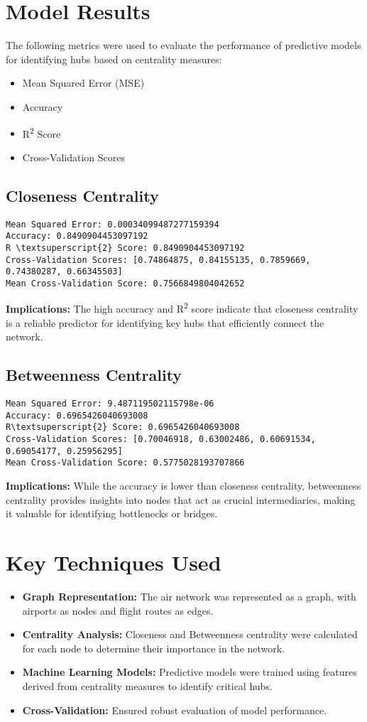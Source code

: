 \documentclass[12pt]{article}
\begin{document}
\section*{Model Results}
The following metrics were used to evaluate the performance of predictive models for identifying hubs based on centrality measures:
\begin{itemize}
	\item Mean Squared Error (MSE)
	\item Accuracy
	\item R\textsuperscript{2} Score
	\item Cross-Validation Scores
\end{itemize}

\subsection*{Closeness Centrality}
\begin{verbatim}
Mean Squared Error: 0.00034099487277159394
Accuracy: 0.8490904453097192
R \textsuperscript{2} Score: 0.8490904453097192
Cross-Validation Scores: [0.74864875, 0.84155135, 0.7859669, 0.74380287, 0.66345503]
Mean Cross-Validation Score: 0.7566849804042652
\end{verbatim}
\textbf{Implications:} The high accuracy and R\textsuperscript{2} score indicate that closeness centrality is a reliable predictor for identifying key hubs that efficiently connect the network.

\subsection*{Betweenness Centrality}
\begin{verbatim}
Mean Squared Error: 9.487119502115798e-06
Accuracy: 0.6965426040693008
R\textsuperscript{2} Score: 0.6965426040693008
Cross-Validation Scores: [0.70046918, 0.63002486, 0.60691534, 0.69054177, 0.25956295]
Mean Cross-Validation Score: 0.5775028193707866
\end{verbatim}
\textbf{Implications:} While the accuracy is lower than closeness centrality, betweenness centrality provides insights into nodes that act as crucial intermediaries, making it valuable for identifying bottlenecks or bridges.

\section*{Key Techniques Used}
\begin{itemize}
	\item \textbf{Graph Representation:} The air network was represented as a graph, with airports as nodes and flight routes as edges.
	\item \textbf{Centrality Analysis:} Closeness and Betweenness centrality were calculated for each node to determine their importance in the network.
	\item \textbf{Machine Learning Models:} Predictive models were trained using features derived from centrality measures to identify critical hubs.
	\item \textbf{Cross-Validation:} Ensured robust evaluation of model performance.
\end{itemize}
\end{document}
